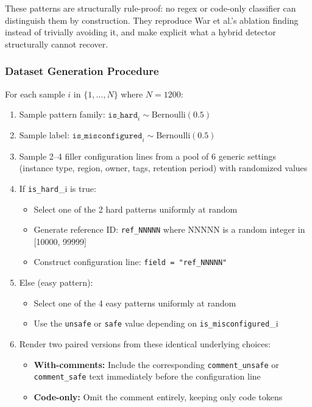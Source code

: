 These patterns are structurally rule-proof: no regex or code-only classifier can distinguish them by construction. They reproduce War et al.'s ablation finding instead of trivially avoiding it, and make explicit what a hybrid detector structurally cannot recover.

\subsubsection{Dataset Generation Procedure}

For each sample $i$ in $\{1, \ldots, N\}$ where $N = 1200$:
\begin{enumerate}
  \item Sample pattern family: $\texttt{is\_hard}_i \sim \text{Bernoulli}(0.5)$
  \item Sample label: $\texttt{is\_misconfigured}_i \sim \text{Bernoulli}(0.5)$
  \item Sample 2--4 filler configuration lines from a pool of 6 generic settings (instance type, region, owner, tags, retention period) with randomized values
  \item If \texttt{is\_hard}_i is true:
  \begin{itemize}
    \item Select one of the 2 hard patterns uniformly at random
    \item Generate reference ID: \texttt{ref\_NNNNN} where NNNNN is a random integer in [10000, 99999]
    \item Construct configuration line: \texttt{field = "ref\_NNNNN"}
  \end{itemize}
  \item Else (easy pattern):
  \begin{itemize}
    \item Select one of the 4 easy patterns uniformly at random
    \item Use the \texttt{unsafe} or \texttt{safe} value depending on \texttt{is\_misconfigured}_i
  \end{itemize}
  \item Render two paired versions from these identical underlying choices:
  \begin{itemize}
    \item \textbf{With-comments:} Include the corresponding \texttt{comment\_unsafe} or \texttt{comment\_safe} text immediately before the configuration line
    \item \textbf{Code-only:} Omit the comment entirely, keeping only code tokens
  \end{itemize}
\end{enumerate}

